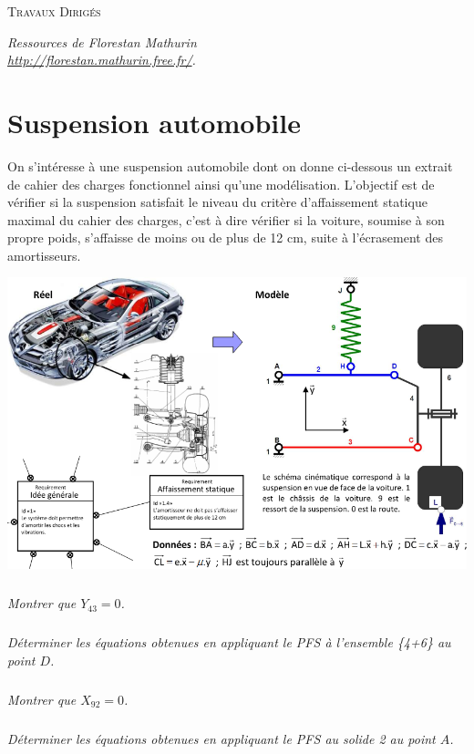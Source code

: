 \documentclass[10pt]{article}
\begin{document}

\begin{center}
\large{\textsc{Travaux Dirigés}}
\end{center}

\begin{flushright}
\textit{Ressources de Florestan Mathurin \\
\url{http://florestan.mathurin.free.fr/}.}
\end{flushright}



\section*{Suspension automobile}


On s’intéresse à une suspension automobile dont on donne ci-dessous un extrait de cahier des charges fonctionnel ainsi qu’une modélisation. L'objectif est de vérifier si la suspension satisfait le niveau du critère d'affaissement statique maximal du cahier des charges, c'est à dire vérifier si la voiture, soumise à son propre poids, s'affaisse de moins ou de plus de 12 cm, suite à l'écrasement des amortisseurs. 


\begin{center}
\includegraphics[width=.9\linewidth]{images/suspension}
\end{center}

\subparagraph{}
\textit{Montrer que $Y_{43} =0$.}

\subparagraph{}
\textit{Déterminer les équations obtenues en appliquant le PFS à l’ensemble \{4+6\} au point $D$.}

\subparagraph{}
\textit{Montrer que $X_{92} =0$.}

\subparagraph{}
\textit{Déterminer les équations obtenues en appliquant le PFS au solide 2 au point $A$.}
\end{document}
